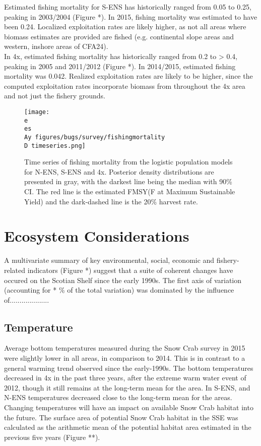 \documentclass[paper=a4, fontsize=11pt]{article}
\newcommand{\D}{.}
\newcommand{\e}{/home/michelle/ecomod_data/}
\newcommand{\es}{snowcrab/}
\newcommand{\Ay}{assessments/2015/}
\begin{document}
Estimated fishing mortality for S-ENS has historically ranged from 0.05 to 0.25, peaking in 2003/2004 (Figure *). In 2015, fishing mortality was estimated to have been 0.24. Localized exploitation rates are likely higher, as not all areas where biomass estimates are provided are fished (e.g. continental slope areas and western, inshore areas of CFA24).\\

In 4x, estimated fishing mortality has historically ranged from 0.2 to > 0.4, peaking in 2005 and 
2011/2012 (Figure *). In 2014/2015, estimated fishing mortality was 0.042. Realized exploitation rates are likely to be higher, since the computed exploitation rates incorporate biomass from throughout the 4x area and not just the fishery grounds.

\begin{figure}[ht]
    \centering
    \texttt{[image: \\e \\es \\Ay figures/bugs/survey/fishingmortality\\D timeseries.png]}
    \caption{Time series of fishing mortality from the logistic population models for N-ENS, S-ENS and 4x. Posterior density distributions are presented in gray, with the darkest line being the median with 90\% CI. The red line is the estimated FMSY(F at Maximum Sustainable Yield) and the dark-dashed line is the 20\% harvest rate.}
\end{figure}
\clearpage

\section{Ecosystem Considerations}
A multivariate summary of key environmental, social, economic and fishery-related indicators (Figure *) suggest that a suite of coherent changes have occured on the Scotian Shelf since the early 1990s. The first axis of variation (accounting for * \% of the total variation) was dominated by the influence of....................

\subsection{Temperature}
Average bottom temperatures measured during the Snow Crab survey in 2015 were slightly lower in all areas, in comparison to 2014. This is in contrast to a general warming trend observed since the early-1990s. The bottom temperatures decreased in 4x in the past three years, after the extreme warm water event of 2012, though it still remains at the long-term mean for the area. In S-ENS, and N-ENS temperatures decreased close to the long-term mean for the areas. Changing temperatures will have an impact on available Snow Crab habitat into the future. The surface area of potential Snow Crab habitat in the SSE was calculated as the arithmetic mean of the potential habitat area estimated in the previous five years (Figure **). 
\end{document}
